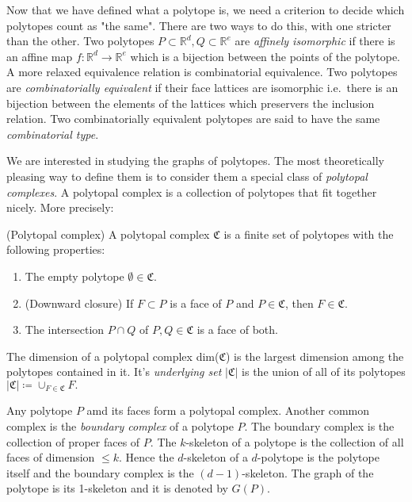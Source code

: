 Now that we have defined what a polytope is, we need a criterion to decide which polytopes 
count as "the same". There are two ways to do this, with one stricter than the other.
Two polytopes $P\subset \mathbb{R}^d, Q \subset \mathbb{R}^e$ are 
\textit{affinely isomorphic} if there is an affine map $f: \mathbb{R}^d 
\rightarrow \mathbb{R}^e$ which is a bijection between the points of the 
polytope. A more relaxed equivalence relation is combinatorial equivalence. Two 
polytopes are \textit{combinatorially equivalent} if their face lattices are isomorphic 
i.e.\ there is an bijection between the elements of the lattices which preservers
the inclusion relation. Two combinatorially equivalent polytopes are said to have the 
same \textit{combinatorial type}. 

We are interested in studying the graphs of polytopes. The most theoretically 
pleasing way to define them is to consider them a special class of 
\textit{polytopal complexes}.
A polytopal complex is a collection of polytopes that fit together nicely.
More precisely:
\begin{definition}
 (Polytopal complex) A polytopal complex $\mathfrak{C}$ is a finite set of 
polytopes with the following properties:
\begin{enumerate}
 \item The empty polytope $\emptyset \in \mathfrak{C}$.
  \item (Downward closure) If $F \subset P$ is a face of $P$ and $P \in 
\mathfrak{C}$, then 
$F \in \mathfrak{C}$.
\item The intersection $P\cap Q$ of $P,Q \in \mathfrak{C}$ is a face of both.

\end{enumerate}

\end{definition}

The dimension of a polytopal complex dim($\mathfrak{C}$) is the largest dimension
among the polytopes contained in it. It's \textit{underlying set} $|\mathfrak{C}|$ is the union of all of 
its polytopes $  |\mathfrak{C}| \coloneqq \cup_{F\in \mathfrak{C}} F.$

Any polytope $P$ amd its faces form a polytopal complex. Another common complex is the 
\textit{boundary complex} of a polytope
$P$. The boundary complex is the collection of proper faces of $P$.
The $k$-skeleton of a polytope is the collection of all faces of dimension $\leq 
k$. Hence the $d$-skeleton of a $d$-polytope is the polytope itself and the 
boundary complex is the $(d-1)$-skeleton. The graph of the polytope is its 
1-skeleton and it is denoted by $G(P)$.

